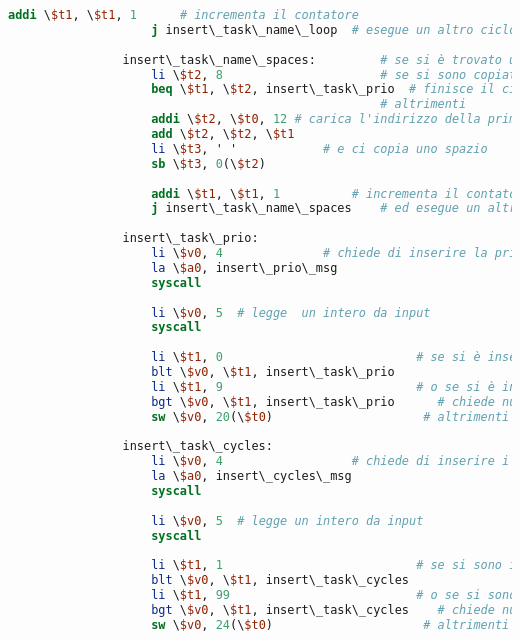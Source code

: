 \begin{center}
\begin{lstlisting}[language=mips, gobble=14, stepnumber=1]
                    addi \$t1, \$t1, 1		# incrementa il contatore
                    j insert\_task\_name\_loop	# esegue un altro ciclo
                    
                insert\_task\_name\_spaces:			# se si è trovato un carattere speciale
                    li \$t2, 8						# se si sono copiati 8 caratteri
                    beq \$t1, \$t2, insert\_task\_prio	# finisce il ciclo
                									# altrimenti
                    addi \$t2, \$t0, 12	# carica l'indirizzo della prima posizione del nome disponibile
                    add \$t2, \$t2, \$t1
                    li \$t3, ' '			# e ci copia uno spazio
                    sb \$t3, 0(\$t2)
                	
                    addi \$t1, \$t1, 1			# incrementa il contatore
                    j insert\_task\_name\_spaces	# ed esegue un altro ciclo
                    
                insert\_task\_prio:
                    li \$v0, 4				# chiede di inserire la priorità del task
                    la \$a0, insert\_prio\_msg
                    syscall
                    
                    li \$v0, 5	# legge  un intero da input
                    syscall
                    
                    li \$t1, 0                           # se si è inserita una priorità minore di 0
                    blt \$v0, \$t1, insert\_task\_prio
                    li \$t1, 9                           # o se si è inserita una priorità maggiore di 9
                    bgt \$v0, \$t1, insert\_task\_prio      # chiede nuovamente la priorità del task
                    sw \$v0, 20(\$t0)                     # altrimenti salva nell'heap
                    
                insert\_task\_cycles:
                    li \$v0, 4					# chiede di inserire i cicli di esecuzione totali del task
                    la \$a0, insert\_cycles\_msg
                    syscall
                    
                    li \$v0, 5	# legge un intero da input
                    syscall
                    
                    li \$t1, 1                           # se si sono inseriti meno di 1 ciclo
                    blt \$v0, \$t1, insert\_task\_cycles
                    li \$t1, 99                          # o se si sono inseriti più di 99 cicli
                    bgt \$v0, \$t1, insert\_task\_cycles    # chiede nuovamente i cicli del task
                    sw \$v0, 24(\$t0)                     # altrimenti salva nell'heap
                    

\end{lstlisting}
\end{center}
